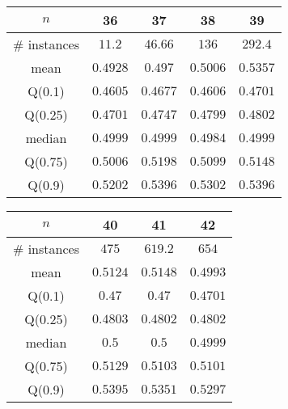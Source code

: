 \begin{tabular}{c|cccc} 
\hline 
$n$ & 36 & 37 & 38 & 39 \tabularnewline 
\hline 
\hline 
\# instances & $11.2$ & $46.66$ & $136$ & $292.4$ \tabularnewline 
mean & $0.4928$ & $0.497$ & $0.5006$ & $0.5357$ \tabularnewline 
Q(0.1) & $0.4605$ & $0.4677$ & $0.4606$ & $0.4701$ \tabularnewline 
Q(0.25) & $0.4701$ & $0.4747$ & $0.4799$ & $0.4802$ \tabularnewline 
median & $0.4999$ & $0.4999$ & $0.4984$ & $0.4999$ \tabularnewline 
Q(0.75) & $0.5006$ & $0.5198$ & $0.5099$ & $0.5148$ \tabularnewline 
Q(0.9) & $0.5202$ & $0.5396$ & $0.5302$ & $0.5396$ \tabularnewline 
\hline 
\end{tabular} 
\medskip{} 

\begin{tabular}{c|ccc} 
\hline 
$n$ & 40 & 41 & 42 \tabularnewline 
\hline 
\hline 
\# instances & $475$ & $619.2$ & $654$ \tabularnewline 
mean & $0.5124$ & $0.5148$ & $0.4993$ \tabularnewline 
Q(0.1) & $0.47$ & $0.47$ & $0.4701$ \tabularnewline 
Q(0.25) & $0.4803$ & $0.4802$ & $0.4802$ \tabularnewline 
median & $0.5$ & $0.5$ & $0.4999$ \tabularnewline 
Q(0.75) & $0.5129$ & $0.5103$ & $0.5101$ \tabularnewline 
Q(0.9) & $0.5395$ & $0.5351$ & $0.5297$ \tabularnewline 
\hline 
\end{tabular} 
\medskip{} 

